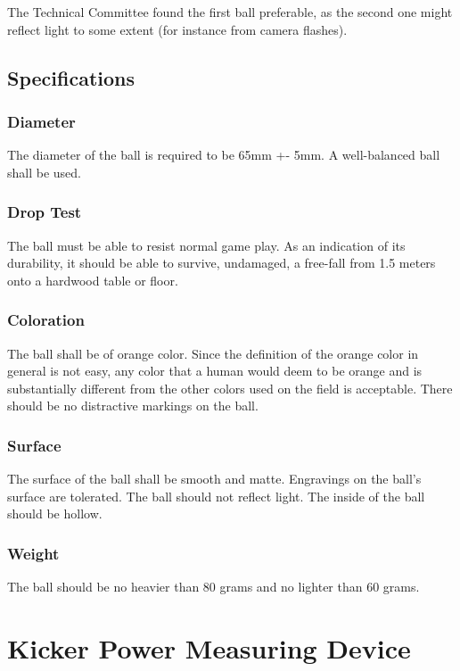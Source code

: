 \documentclass{article}
\begin{document}
The Technical Committee found the first ball preferable, as the second one
might reflect light to some extent (for instance from camera flashes).

\subsection{Specifications}

\subsubsection{Diameter}

The diameter of the ball is required to be 65mm +- 5mm. A well-balanced ball
shall be used.

\subsubsection{Drop Test}

The ball must be able to resist normal game play. As an indication of its
durability, it should be able to survive, undamaged, a free-fall from 1.5
meters onto a hardwood table or floor.

\subsubsection{Coloration}

The ball shall be of orange color. Since the definition of the orange color in
general is not easy, any color that a human would deem to be orange and is
substantially different from the other colors used on the field is acceptable.
There should be no distractive markings on the ball.

\subsubsection{Surface}

The surface of the ball shall be smooth and matte. Engravings on the ball's
surface are tolerated. The ball should not reflect light. The inside of the
ball should be hollow.

\subsubsection{Weight}

The ball should be no heavier than 80 grams and no lighter than 60 grams.

\section{Kicker Power Measuring Device\label{ref-064}}
\end{document}
